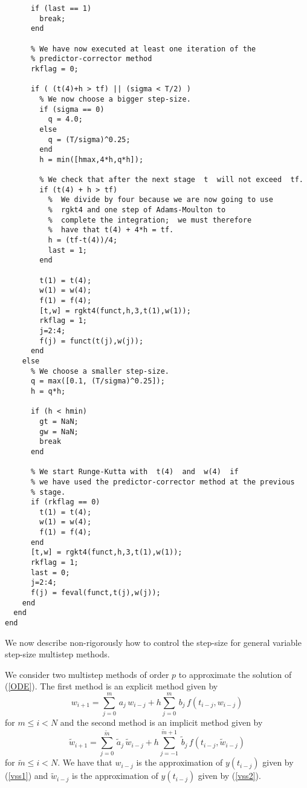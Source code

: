 \begin{code}
\begin{verbatim}
      if (last == 1)
        break;
      end
      
      % We have now executed at least one iteration of the
      % predictor-corrector method
      rkflag = 0;
      
      if ( (t(4)+h > tf) || (sigma < T/2) )
        % We now choose a bigger step-size.
        if (sigma == 0)
          q = 4.0;
        else
          q = (T/sigma)^0.25;
        end
        h = min([hmax,4*h,q*h]);

        % We check that after the next stage  t  will not exceed  tf.
        if (t(4) + h > tf)
          %  We divide by four because we are now going to use
          %  rgkt4 and one step of Adams-Moulton to
          %  complete the integration;  we must therefore
          %  have that t(4) + 4*h = tf. 
          h = (tf-t(4))/4;
          last = 1;
        end

        t(1) = t(4);
        w(1) = w(4);
        f(1) = f(4);
        [t,w] = rgkt4(funct,h,3,t(1),w(1));
        rkflag = 1;
        j=2:4;
        f(j) = funct(t(j),w(j));
      end
    else
      % We choose a smaller step-size.
      q = max([0.1, (T/sigma)^0.25]);
      h = q*h;

      if (h < hmin)
        gt = NaN;
        gw = NaN;
        break
      end

      % We start Runge-Kutta with  t(4)  and  w(4)  if
      % we have used the predictor-corrector method at the previous
      % stage.
      if (rkflag == 0)
        t(1) = t(4);
        w(1) = w(4);
        f(1) = f(4);
      end
      [t,w] = rgkt4(funct,h,3,t(1),w(1));
      rkflag = 1;
      last = 0;
      j=2:4;
      f(j) = feval(funct,t(j),w(j));
    end
  end  
end
\end{verbatim}
\end{code}

We now describe non-rigorously how to control the step-size for general
variable step-size multistep methods.

We consider two multistep methods of order $p$ to approximate the
solution of (\ref{ODE}).  The first method is an explicit method given by
\begin{equation} \label{vss1}
w_{i+1} = \sum_{j=0}^m\,a_j\,w_{i-j} + h \sum_{j=0}^m\,b_j\,f(t_{i-j},w_{i-j})
\end{equation}
for $m\leq i < N$ and the second method is an implicit method given by
\begin{equation} \label{vss2}
\tilde{w}_{i+1} = \sum_{j=0}^{\tilde{m}}\,\tilde{a}_j\,\tilde{w}_{i-j}
+ h \sum_{j=-1}^{\tilde{m}+1}\,\tilde{b}_j\,f(t_{i-j},\tilde{w}_{i-j})
\end{equation}
for $\tilde{m} \leq i < N$.  We have that
$w_{i-j}$ is the approximation of $y(t_{i-j})$ given by
(\ref{vss1}) and $\tilde{w}_{i-j}$ is the approximation of
$y(t_{i-j})$ given by (\ref{vss2}).

